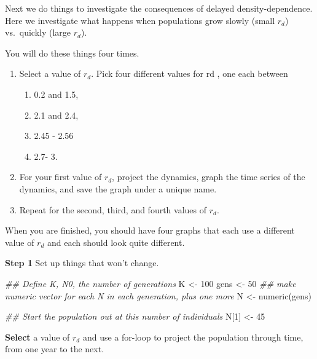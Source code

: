 \documentclass[
  letterpaper,
  DIV=11,
  numbers=noendperiod]{scrreprt}
\newenvironment{Shaded}{\begin{snugshade}}{\end{snugshade}}
\newcommand{\DecValTok}[1]{\textcolor[rgb]{0.68,0.00,0.00}{#1}}
\newcommand{\DocumentationTok}[1]{\textcolor[rgb]{0.37,0.37,0.37}{\textit{#1}}}
\newcommand{\FunctionTok}[1]{\textcolor[rgb]{0.28,0.35,0.67}{#1}}
\newcommand{\NormalTok}[1]{\textcolor[rgb]{0.00,0.23,0.31}{#1}}
\newcommand{\OtherTok}[1]{\textcolor[rgb]{0.00,0.23,0.31}{#1}}
\providecommand{\tightlist}{%
  \setlength{\itemsep}{0pt}\setlength{\parskip}{0pt}}
\begin{document}
Next we do things to investigate the consequences of delayed
density-dependence. Here we investigate what happens when populations
grow slowly (small \(r_d\)) vs.~quickly (large \(r_d\)).

You will do these things four times.

\begin{enumerate}
\def\labelenumi{\arabic{enumi}.}
\tightlist
\item
  Select a value of \(r_d\). Pick four different values for rd , one
  each between

  \begin{enumerate}
  \def\labelenumii{\alph{enumii}.}
  \tightlist
  \item
    0.2 and 1.5,
  \item
    2.1 and 2.4,
  \item
    2.45 - 2.56
  \item
    2.7- 3.
  \end{enumerate}
\item
  For your first value of \(r_d\), project the dynamics, graph the time
  series of the dynamics, and save the graph under a unique name.
\item
  Repeat for the second, third, and fourth values of \(r_d\).
\end{enumerate}

When you are finished, you should have four graphs that each use a
different value of \(r_d\) and each should look quite different.

\textbf{Step 1} Set up things that won't change.

\begin{Shaded}
\begin{Highlighting}[]
\DocumentationTok{\#\# Define K, N0, the number of generations}
\NormalTok{K }\OtherTok{\textless{}{-}} \DecValTok{100}
\NormalTok{gens }\OtherTok{\textless{}{-}} \DecValTok{50}
\DocumentationTok{\#\# make numeric vector for each N in each generation, plus one more}
\NormalTok{N }\OtherTok{\textless{}{-}} \FunctionTok{numeric}\NormalTok{(gens)}

\DocumentationTok{\#\# Start the population out at this number of individuals}
\NormalTok{N[}\DecValTok{1}\NormalTok{] }\OtherTok{\textless{}{-}} \DecValTok{45}
\end{Highlighting}
\end{Shaded}

\textbf{Select} a value of \(r_d\) and use a for-loop to project the
population through time, from one year to the next.
\end{document}
